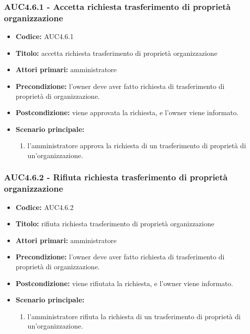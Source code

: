 \documentclass[casi-duso]{subfiles}
\begin{document}
\subsubsection{AUC4.6.1 - Accetta richiesta trasferimento di proprietà organizzazione}%
\label{subsub:AUC4.6.1}
\begin{itemize}
  \item \textbf{Codice:} AUC4.6.1
  \item \textbf{Titolo:} accetta richiesta trasferimento di proprietà organizzazione
  \item \textbf{Attori primari:} amministratore
  \item \textbf{Precondizione:} l'owner deve aver fatto richiesta di trasferimento di proprietà di organizzazione.
  \item \textbf{Postcondizione:} viene approvata la richiesta, e l'owner viene informato.
  \item \textbf{Scenario principale:}
  \begin{enumerate}
    \item l'amministratore approva la richiesta di un trasferimento di proprietà di un'organizzazione.
  \end{enumerate}
\end{itemize}  

\subsubsection{AUC4.6.2 - Rifiuta richiesta trasferimento di proprietà organizzazione}%
\label{subsub:AUC4.6.2}
\begin{itemize}
  \item \textbf{Codice:} AUC4.6.2
  \item \textbf{Titolo:} rifiuta richiesta trasferimento di proprietà organizzazione
  \item \textbf{Attori primari:} amministratore
  \item \textbf{Precondizione:} l'owner deve aver fatto richiesta di trasferimento di proprietà di organizzazione.
  \item \textbf{Postcondizione:} viene rifiutata la richiesta, e l'owner viene informato.
  \item \textbf{Scenario principale:}
  \begin{enumerate}
    \item  l'amministratore rifiuta la richiesta di un trasferimento di proprietà di un'organizzazione.
  \end{enumerate}
\end{itemize}
\end{document}
